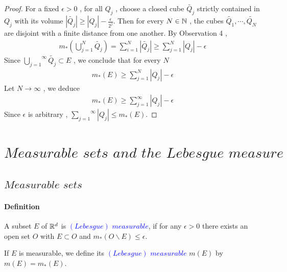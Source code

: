 \begin{enumerate}
		\vspace*{2em}
		\begin{proof}
			For a fixed $\epsilon > 0$ , for all $Q_j$ , choose a closed cube $\widetilde{Q_j}$ strictly contained in $Q_j$ with its volume $\left| \widetilde{Q_j} \right| \geq \left| Q_j \right| - \frac{\epsilon}{2^j}$. Then for every $N \in \mathbb{N}$ , the cubes $\widetilde{Q_1} , \cdots , \widetilde{Q_N}$ are disjoint with a finite distance from one another. By Observation 4 , 
			\begin{align}
				m_{*}(\bigcup_{j = 1}^{N}{\widetilde{Q_j}}) = \sum_{i = 1}^{N}{\left| \widetilde{Q_j} \right|} \geq \sum_{j = 1}^{N}{\left| Q_j \right|} - \epsilon
			\end{align}
			Since $\overset{\infty}{\underset{j = 1}{\bigcup}}{\widetilde{Q_{j}}} \subset E$ , we conclude that for every $N$
			\begin{align}
				m_{*}(E) \geq \sum_{j = 1}^{N}{\left| Q_j \right|} - \epsilon
			\end{align}
			Let $N \to \infty$ , we deduce
			\begin{align}
				m_{*}(E) \geq \sum_{j = 1}^{\infty}{\left| Q_j \right|} - \epsilon
			\end{align}
			Since $\epsilon$ is arbitrary , $\overset{\infty}{\underset{j = 1}{\sum}}{\left| Q_j \right|} \leq m_{*}(E)$.
		\end{proof}
	\end{enumerate}

\newpage
\section{$Measurable \,\, sets \,\, and \,\, the \,\, Lebesgue \,\, measure$}
\subsection{$Measurable \,\, sets$}
\paragraph{Definition}
	\begin{defn}
		A subset $E$ of $\mathbb{R}^d$ is \underline{\textcolor{blue}{\textbf{$(Lebesgue) \,\, measurable$}}}, if for any $\epsilon > 0$ there exists an open set $O$ with $E \subset O$ and $m_{*}(O \backslash E) \leq \epsilon$.
		
		\vspace{1em}
		
		If $E$ is measurable, we define its \underline{\textcolor{blue}{\textbf{$(Lebesgue) \,\, measurable$}}} $m(E)$ by $m(E) = m_{*}(E)$.
	\end{defn}

